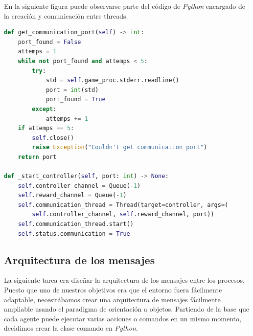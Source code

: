 En la siguiente figura puede observarse parte del código de \textit{Python} encargado de la creación y comunicación entre threads.
\begin{lstlisting}[language=Python]
def get_communication_port(self) -> int:
    port_found = False
    attemps = 1
    while not port_found and attemps < 5:
        try:
            std = self.game_proc.stderr.readline()
            port = int(std)
            port_found = True
        except:
            attemps += 1
    if attemps == 5:
        self.close()
        raise Exception("Couldn't get communication port")
    return port

def _start_controller(self, port: int) -> None:
    self.controller_channel = Queue(-1)
    self.reward_channel = Queue(-1)
    self.communication_thread = Thread(target=controller, args=(
        self.controller_channel, self.reward_channel, port))
    self.communication_thread.start()
    self.status.communication = True
\end{lstlisting}


\subsection{Arquitectura de los mensajes}

La siguiente tarea era diseñar la arquitectura de los mensajes entre los procesos. Puesto que uno de nuestros objetivos era que el entorno fuera fácilmente adaptable, necesitábamos crear una arquitectura de mensajes fácilmente ampliable usando el paradigma de orientación a objetos. Partiendo de la base que cada agente puede ejecutar varias acciones o comandos en un mismo momento, decidimos crear la clase comando en \textit{Python}.

